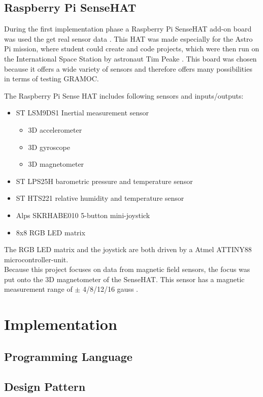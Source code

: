 \subsection{Raspberry Pi SenseHAT}

During the first implementation phase a Raspberry Pi SenseHAT add-on board was used the get real sensor data \cite{SenseHAT}. This HAT was made especially for the Astro Pi mission, where student could create and code projects, which were then run on the International Space Station by astronaut Tim Peake \cite{AstroPiMission}. This board was chosen because it offers a wide variety of sensors and therefore offers many possibilities in terms of testing GRAMOC.

The Raspberry Pi Sense HAT includes following sensors and inputs/outputs:

\begin{itemize}
	\item ST LSM9DS1 Inertial measurement sensor
		\begin{itemize}
			\item 3D accelerometer
			\item 3D gyroscope
			\item 3D magnetometer
		\end{itemize}
	\item ST LPS25H barometric pressure and temperature sensor
	\item ST HTS221 relative humidity and temperature sensor
	\item Alps SKRHABE010 5-button mini-joystick
	\item 8x8 RGB LED matrix
\end{itemize}
\bigskip
The RGB LED matrix and the joystick are both driven by a Atmel ATTINY88 microcontroller-unit.\\
Because this project focuses on data from magnetic field sensors, the focus was put onto the 3D magnetometer of the SenseHAT. This sensor has a magnetic measurement range of $\pm$ 4/8/12/16 gauss \cite{InertialSensorsManual}.

\section{Implementation}
\subsection{Programming Language}
\subsection{Design Pattern}
